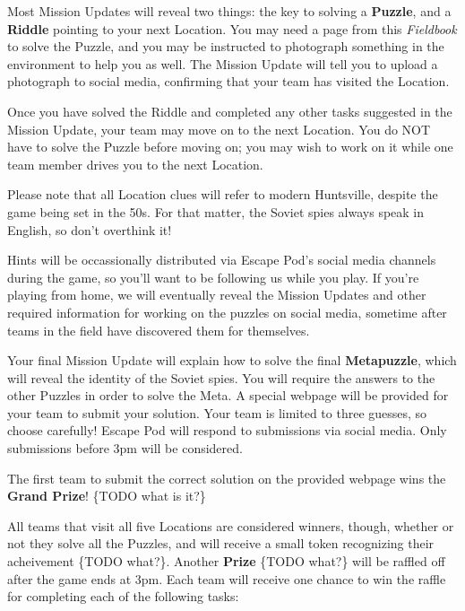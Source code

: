 \documentclass{puzzlehunt}
\begin{document}
Most Mission Updates will reveal two things: the key to solving a \textbf{Puzzle},
and a \textbf{Riddle} pointing to your next Location. You may need a page from
this \textit{Fieldbook} to solve the Puzzle, and you may be instructed
to photograph something in the environment to help you as well. The Mission Update
will tell you to upload a photograph to social media, confirming that your team
has visited the Location.

Once you have solved the Riddle and completed any other tasks suggested in
the Mission Update, your team may move on to the next Location. You do NOT have
to solve the Puzzle before moving on; you may wish to work on it while one team member
drives you to the next Location.

Please note that all Location clues will refer to
modern Huntsville, despite the game being set in the 50s. For that matter,
the Soviet spies always speak in English, so don't overthink it!

Hints will be occassionally distributed via Escape Pod's social media channels
during the game, so you'll want to be following us while you play. If you're playing
from home, we will eventually reveal the Mission Updates and other required information
for working on the puzzles on social media, sometime after teams in the field have
discovered them for themselves.


Your final Mission Update will explain how to solve the final
\textbf{Metapuzzle}, which will reveal the identity of the Soviet spies.
You will require the answers to the other Puzzles in order to solve the Meta.
A special webpage will be provided for your team to submit your solution. Your
team is limited to three guesses, so choose carefully! Escape Pod will respond
to submissions via social media. Only submissions before 3pm will be considered.


The first team to submit the correct solution on the provided webpage wins the
\textbf{Grand Prize}! \{TODO what is it?\}

All teams that visit all five Locations are considered winners, though, whether
or not they solve all the Puzzles, and will receive a small token recognizing
their acheivement \{TODO what?\}. Another \textbf{Prize} \{TODO what?\} will be
raffled off after the game ends at 3pm. Each team will receive one chance to
win the raffle for completing each of the following tasks:
\end{document}
